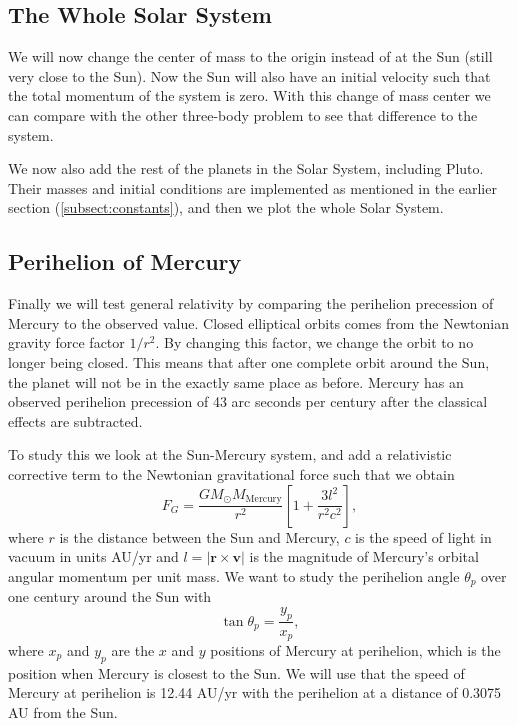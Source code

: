 \documentclass[12pt,a4paper,english]{article}
\begin{document}
\subsection{The Whole Solar System}
\label{subsect:SolarSystem}
We will now change the center of mass to the origin instead of at the Sun (still very close to the Sun). Now the Sun will also have an initial velocity such that the total momentum of the system is zero. With this change of mass center we can compare with the other three-body problem to see that difference to the system.

We now also add the rest of the planets in the Solar System, including Pluto. Their masses and initial conditions are implemented as mentioned in the earlier section (\ref{subsect:constants}), and then we plot the whole Solar System.

\subsection{Perihelion of Mercury}
\label{subsect:Mercury}
Finally we will test general relativity by comparing the perihelion precession of Mercury to the observed value. Closed elliptical orbits comes from the Newtonian gravity force factor $1/r^2$. By changing this factor, we change the orbit to no longer being closed. This means that after one complete orbit around the Sun, the planet will not be in the exactly same place as before. Mercury has an observed perihelion precession of 43 arc seconds per century after the classical effects are subtracted. 

To study this we look at the Sun-Mercury system, and add a relativistic corrective term to the Newtonian gravitational force such that we obtain
\begin{equation}
\label{eq:rel_FG}
F_G=\frac{GM_{\odot}M_{\text{Mercury}}}{r^2}\left[1+\frac{3l^2}{r^2c^2}\right],
\end{equation} 
where $r$ is the distance between the Sun and Mercury, $c$ is the speed of light in vacuum in units AU/yr and $l=|\textbf{r}\times \textbf{v}|$ is the magnitude of Mercury's orbital angular momentum per unit mass. We want to study the perihelion angle $\theta_p$ over one century around the Sun with \[\tan\theta_p=\frac{y_p}{x_p},\] where $x_p$ and $y_p$ are the $x$ and $y$ positions of Mercury at perihelion, which is the position when Mercury is closest to the Sun. We will use that the speed of Mercury at perihelion is 12.44 AU/yr with the perihelion at a distance of 0.3075 AU from the Sun.
\end{document}
